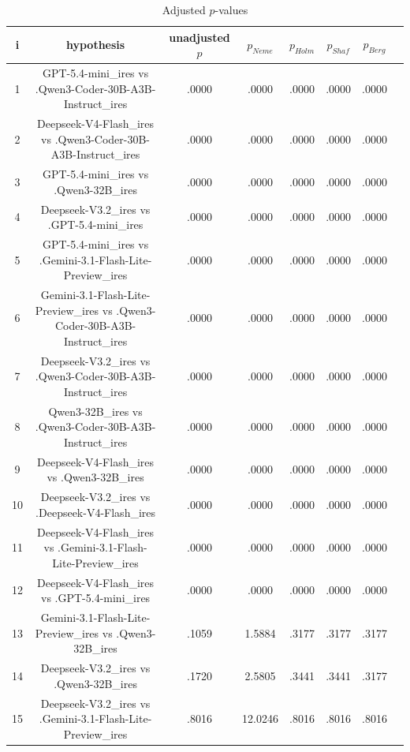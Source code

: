 \documentclass[a4paper,10pt]{article}
\begin{document}
\begin{landscape}
\begin{table}[!htp]
\centering\tiny
\caption{Adjusted $p$-values}
\begin{tabular}{cccccccc}
i&hypothesis&unadjusted $p$&$p_{Neme}$&$p_{Holm}$&$p_{Shaf}$&$p_{Berg}$\\
\hline
1&GPT-5.4-mini_ires vs .Qwen3-Coder-30B-A3B-Instruct_ires&.0000&.0000&.0000&.0000&.0000\\2&Deepseek-V4-Flash_ires vs .Qwen3-Coder-30B-A3B-Instruct_ires&.0000&.0000&.0000&.0000&.0000\\3&GPT-5.4-mini_ires vs .Qwen3-32B_ires&.0000&.0000&.0000&.0000&.0000\\4&Deepseek-V3.2_ires vs .GPT-5.4-mini_ires&.0000&.0000&.0000&.0000&.0000\\5&GPT-5.4-mini_ires vs .Gemini-3.1-Flash-Lite-Preview_ires&.0000&.0000&.0000&.0000&.0000\\6&Gemini-3.1-Flash-Lite-Preview_ires vs .Qwen3-Coder-30B-A3B-Instruct_ires&.0000&.0000&.0000&.0000&.0000\\7&Deepseek-V3.2_ires vs .Qwen3-Coder-30B-A3B-Instruct_ires&.0000&.0000&.0000&.0000&.0000\\8&Qwen3-32B_ires vs .Qwen3-Coder-30B-A3B-Instruct_ires&.0000&.0000&.0000&.0000&.0000\\9&Deepseek-V4-Flash_ires vs .Qwen3-32B_ires&.0000&.0000&.0000&.0000&.0000\\10&Deepseek-V3.2_ires vs .Deepseek-V4-Flash_ires&.0000&.0000&.0000&.0000&.0000\\11&Deepseek-V4-Flash_ires vs .Gemini-3.1-Flash-Lite-Preview_ires&.0000&.0000&.0000&.0000&.0000\\12&Deepseek-V4-Flash_ires vs .GPT-5.4-mini_ires&.0000&.0000&.0000&.0000&.0000\\13&Gemini-3.1-Flash-Lite-Preview_ires vs .Qwen3-32B_ires&.1059&1.5884&.3177&.3177&.3177\\14&Deepseek-V3.2_ires vs .Qwen3-32B_ires&.1720&2.5805&.3441&.3441&.3177\\15&Deepseek-V3.2_ires vs .Gemini-3.1-Flash-Lite-Preview_ires&.8016&12.0246&.8016&.8016&.8016\\\hline
\end{tabular}
\end{table}

\end{landscape}
\end{document}
